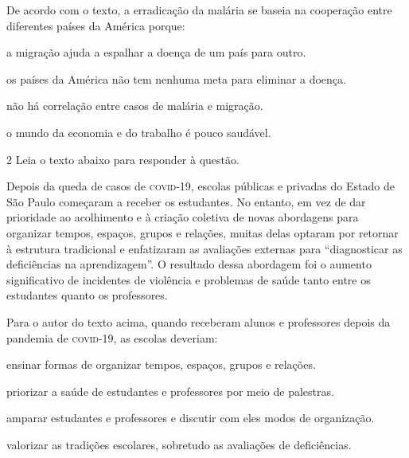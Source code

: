 De acordo com o texto, a erradicação da malária se baseia na cooperação entre diferentes países 
da América porque:

\begin{escolha}

  \item a migração ajuda a espalhar a doença de um país para outro.

  \item os países da América não tem nenhuma meta para eliminar a doença.

  \item não há correlação entre casos de malária e migração. 

  \item o mundo da economia e do trabalho é pouco saudável.

\end{escolha}

\num{2} Leia o texto abaixo para responder à questão.

\begin{myquote}

Depois da queda de casos de \textsc{covid}-19, escolas públicas e privadas 
do Estado de São Paulo começaram a receber os estudantes. No entanto, em vez 
de dar prioridade ao acolhimento e à criação coletiva de novas abordagens para
organizar tempos, espaços, grupos e relações, muitas delas optaram por retornar 
à estrutura tradicional e enfatizaram as avaliações externas para ``diagnosticar 
as deficiências na aprendizagem''. O resultado dessa abordagem foi o aumento 
significativo de incidentes de violência e problemas de saúde tanto entre os
estudantes quanto os professores.

\end{myquote}


Para o autor do texto acima, quando receberam alunos e professores depois da pandemia de 
\textsc{covid}-19, as escolas deveriam: 

\begin{escolha}

  \item ensinar formas de organizar tempos, espaços, grupos e relações.

  \item priorizar a saúde de estudantes e professores por meio de palestras.

  \item amparar estudantes e professores e discutir com eles modos de organização.

  \item valorizar as tradições escolares, sobretudo as avaliações de deficiências.  

\end{escolha}

